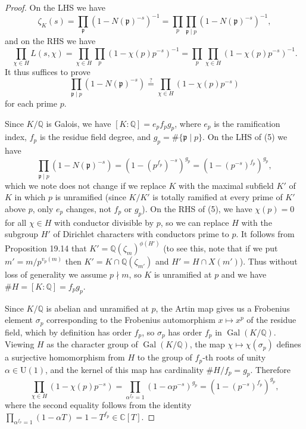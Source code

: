 \documentclass[UTF8,11pt]{ctexart}
\theoremstyle{definition}
\newcommand{\C}{\mathbb C}
\newcommand{\Q}{\mathbb Q}
\DeclareMathOperator{\Gal}{Gal}
\begin{document}
\begin{proof}
On the LHS we have
\[
\zeta_K(s)=\prod_{\mathfrak p}(1-N(\mathfrak p)^{-s})^{-1}
=\prod_p\prod_{\mathfrak p\mid p}(1-N(\mathfrak p)^{-s})^{-1},
\]
and on the RHS we have
\[
\prod_{\chi\in H}L(s,\chi)=\prod_{\chi\in H}\prod_p(1-\chi(p)p^{-s})^{-1}
=\prod_p\prod_{\chi\in H}(1-\chi(p)p^{-s})^{-1}.
\]
It thus suffices to prove
\[
\prod_{\mathfrak p\mid p}(1-N(\mathfrak p)^{-s})\stackrel{?}{=}\prod_{\chi\in H}(1-\chi(p)p^{-s})\tag{5}
\]
for each prime $p$.

Since $K/\Q$ is Galois, we have $[K:\Q]=e_pf_pg_p$, where $e_p$ is the ramification index, $f_p$ is the residue field degree, and $g_p=\#\{\mathfrak p\mid p\}$. On the LHS of (5) we have
\[
\prod_{\mathfrak p\mid p}(1-N(\mathfrak p)^{-s})=(1-(p^{f_p})^{-s})^{g_p}=(1-(p^{-s})^{f_p})^{g_p},
\]
which we note does not change if we replace $K$ with the maximal subfield $K'$ of $K$ in which $p$ is unramified (since $K/K'$ is totally ramified at every prime of $K'$ above $p$, only $e_p$ changes, not $f_p$ or $g_p$). On the RHS of (5), we have $\chi(p)=0$ for all $\chi\in H$ with conductor divisible by $p$, so we can replace $H$ with the subgroup $H'$ of Dirichlet characters with conductors prime to $p$. It follows from Proposition 19.14 that $K'=\Q(\zeta_m)^{\phi(H')}$ (to see this, note that if we put $m'=m/p^{v_p(m)}$ then $K'=K\cap\Q(\zeta_{m'})$ and $H'=H\cap X(m')$). Thus without loss of generality we assume $p\nmid m$, so $K$ is unramified at $p$ and we have $\#H=[K:\Q]=f_pg_p$.

Since $K/\Q$ is abelian and unramified at $p$, the Artin map gives us a Frobenius element $\sigma_p$ corresponding to the Frobenius automorphism $x\mapsto x^p$ of the residue field, which by definition has order $f_p$, so $\sigma_p$ has order $f_p$ in $\Gal(K/\Q)$. Viewing $H$ as the character group of $\Gal(K/\Q)$, the map $\chi\mapsto\chi(\sigma_p)$ defines a surjective homomorphism from $H$ to the group of $f_p$-th roots of unity $\alpha\in\mathrm U(1)$, and the kernel of this map has cardinality $\#H/f_p=g_p$. Therefore
\[
\prod_{\chi\in H}(1-\chi(p)p^{-s})=\prod_{\alpha^{f_p}=1}(1-\alpha p^{-s})^{g_p}=(1-(p^{-s})^{f_p})^{g_p},
\]
where the second equality follows from the identity $\prod_{\alpha^{f_p}=1}(1-\alpha T)=1-T^{f_p}\in\C[T]$.
\end{proof}
\end{document}

